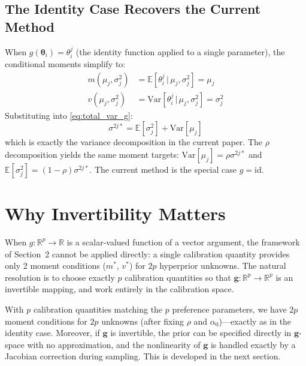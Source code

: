 \documentclass[11pt,a4paper]{article}
\theoremstyle{definition}
\newcommand{\E}{\mathbb{E}}
\newcommand{\Var}{\mathrm{Var}}
\newcommand{\given}{\,|\,}
\newcommand{\btheta}{\boldsymbol{\theta}}
\begin{document}
\subsection{The Identity Case Recovers the Current Method}
\label{sec:identity}

When $g(\btheta_i) = \theta_i^j$ (the identity function applied to a single
parameter), the conditional moments simplify to:
\begin{align}
    m(\mu_j, \sigma_j^2) &= \E[\theta_i^j \given \mu_j, \sigma_j^2] = \mu_j \\
    v(\mu_j, \sigma_j^2) &= \Var[\theta_i^j \given \mu_j, \sigma_j^2] = \sigma_j^2
\end{align}
Substituting into \eqref{eq:total_var_g}:
\begin{equation}
    \sigma^{2j*} = \E[\sigma_j^2] + \Var[\mu_j]
\end{equation}
which is exactly the variance decomposition in the current paper. The $\rho$
decomposition yields the same moment targets:
$\Var[\mu_j] = \rho \sigma^{2j*}$ and $\E[\sigma_j^2] = (1-\rho)\sigma^{2j*}$.
The current method is the special case $g = \text{id}$.


\section{Why Invertibility Matters}

When $g: \mathbb{R}^p \to \mathbb{R}$ is a scalar-valued function of a vector
argument, the framework of Section~2 cannot be applied directly: a single
calibration quantity provides only 2 moment conditions ($m^*$, $v^*$) for $2p$
hyperprior unknowns. The natural resolution is to choose exactly $p$
calibration quantities so that
$\mathbf{g}: \mathbb{R}^p \to \mathbb{R}^p$ is an invertible mapping, and
work entirely in the calibration space.

With $p$ calibration quantities matching the $p$ preference parameters, we
have $2p$ moment conditions for $2p$ unknowns (after fixing $\rho$ and
$\alpha_0$)---exactly as in the identity case. Moreover, if $\mathbf{g}$ is
invertible, the prior can be specified directly in $\mathbf{g}$-space with no
approximation, and the nonlinearity of $\mathbf{g}$ is handled exactly by a
Jacobian correction during sampling. This is developed in the next section.


\end{document}
